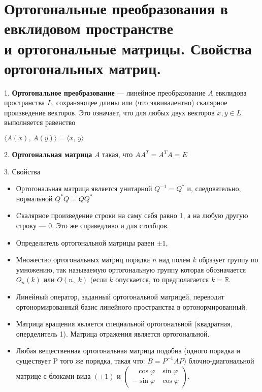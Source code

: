 \section{
    Ортогональные преобразования в евклидовом пространстве \\
    и ортогональные матрицы. Свойства ортогональных матриц.
}

1. \textbf{Ортогональное преобразование} — линейное преобразование 
${\displaystyle A}$ евклидова пространства ${\displaystyle L}$, 
сохраняющее длины или (что эквивалентно) скалярное произведение векторов. 
Это означает, что для любых двух векторов ${\displaystyle x,y\in L}$ выполняется равенство

${\displaystyle \langle A(x),\,A(y)\rangle =\langle x,\,y\rangle}$

2. \textbf{Ортогональная матрица} $A$ такая, что $AA^{{T}}=A^{{T}}A=E$

3. Свойства
\begin{itemize}
    \item Ортогональная матрица является унитарной 
    ${\displaystyle Q^{-1}=Q^{*}}$ и, следовательно, нормальной 
    ${\displaystyle Q^{*}Q=QQ^{*}}$
    \item Cкалярное произведение строки на саму себя равно 1, а на любую другую строку — 0. Это же справедливо и для столбцов.
    
    \item Определитель ортогональной матрицы равен ${\displaystyle \pm 1}$, 
    \item Множество ортогональных матриц порядка ${\displaystyle n}$ 
    над полем ${\displaystyle k}$ образует группу по умножению, 
    так называемую ортогональную группу которая обозначается ${\displaystyle O_{n}(k)}$ 
    или ${\displaystyle O(n,\;k)}$ (если ${\displaystyle k}$ опускается, 
    то предполагается ${\displaystyle k=\mathbb {R} }$.
    \item Линейный оператор, заданный ортогональной матрицей, 
    переводит ортонормированный базис линейного пространства в ортонормированный.
    \item Матрица вращения является специальной ортогональной (квадратная, оперделитель 1). 
    Матрица отражения является ортогональной.
    \item Любая вещественная ортогональная матрица подобна 
    (одного порядка и существует P того же порядка, такая что: ${\displaystyle B=P^{-1}AP}$)
    блочно-диагональной матрице с блоками вида $(\pm 1)$ и 
    ${\displaystyle {\begin{pmatrix}\ \ \ \cos \varphi &\sin \varphi \\-\sin \varphi &\cos \varphi \end{pmatrix}}.}$
\end{itemize}